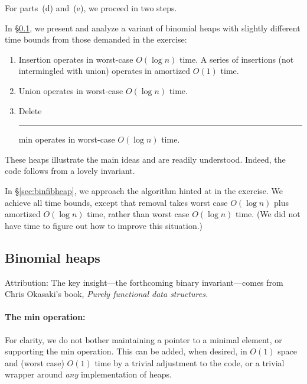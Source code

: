 \documentclass[a4paper]{article}
\newcommand{\any}{{\rule[-.2ex]{1ex}{.4pt}}}	%
\newcommand*{\Sref}[1]{\hyperref[#1]{\S\ref*{#1}}}
\begin{document}
\begin{enumerate}[a)]
%	
%	
	
\end{enumerate}
For parts~(d) and~(e), we proceed in two steps.

In \Sref{sec:binheap}, we present and analyze a variant of binomial heaps with slightly different time bounds from those demanded in the exercise:
\begin{enumerate}
	
	\item Insertion operates in worst-case $O(\log n)$ time.
	A series of insertions (not intermingled with union) operates in amortized $O(1)$ time.
	
	\item Union operates in worst-case $O(\log n)$ time.

	\item Delete\any{}min operates in worst-case $O(\log n)$ time.
\end{enumerate}
These heaps illustrate the main ideas and are readily understood.
Indeed, the code follows from a lovely invariant.

In \Sref{sec:binfibheap}, we approach the algorithm hinted at in the exercise.
We achieve all time bounds, except that removal takes worst case $O(\log n)$ plus amortized $O(\log n)$ time, rather than worst case $O(\log n)$ time.
(We did not have time to figure out how to improve this situation.)

\subsection{Binomial heaps}\label{sec:binheap}

Attribution:
The key insight---the forthcoming binary invariant---comes from Chris Okasaki's book, \emph{Purely functional data structures.}

\paragraph{The min operation:}
For clarity, we do not bother maintaining a pointer to a minimal element, or supporting the min operation.
This can be added, when desired, in $O(1)$ space and (worst case) $O(1)$ time by a trivial adjustment to the code, or a trivial wrapper around \emph{any} implementation of heaps.
\end{document}
